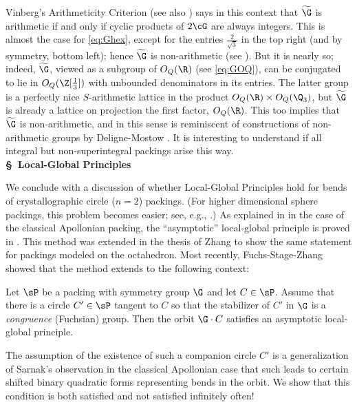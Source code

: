 \documentclass[12pt,reqno]{amsart}
\begin{document}
Vinberg's Arithmeticity Criterion \cite{Vinberg1967} (see also \cite[Theorem 3.1]{VinbergShvartsman1993}) says in this context that $\widetilde\G$ is arithmetic if and only if cyclic products of $2\cG$ are always integers. 
This is almost the case for \eqref{eq:Ghex}, except for the entries $\frac2{\sqrt3}$ in the top right (and by symmetry, bottom left); hence $\widetilde\G$ is non-arithmetic (see ). But it is nearly so; indeed, $\widetilde\G$, viewed as a subgroup of $O_Q(\R)$ (see \eqref{eq:GOQ}), can be conjugated to lie in $O_Q(\Z[\frac13])$ with unbounded denominators in its entries. The latter group is a perfectly nice $S$-arithmetic lattice in the product $O_Q(\R)\times O_Q(\Q_3)$, but $\widetilde\G$ is already a lattice on projection the first factor, $O_Q(\R)$. This too implies that $\widetilde\G$ is non-arithmetic, and in this sense is reminiscent of constructions of non-arithmetic groups by Deligne-Mostow \cite{DeligneMostow1986}. It is interesting to understand if all integral but non-superintegral packings arise this way. 
\\

\noindent
{\bf\S\  Local-Global Principles}\

We conclude with a discussion of whether  Local-Global Principles hold for bends of crystallographic circle ($n=2$) packings. (For higher dimensional sphere packings, this problem becomes easier; see, e.g., \cite{Kontorovich2017}.) As explained in \cite{Kontorovich2013} in the case of the classical Apollonian packing, the ``asymptotic'' local-global principle is proved in \cite{BourgainKontorovich2014b}.
This method was extended in the thesis of Zhang \cite{Zhang2015} to show the same statement for packings modeled on the octahedron. Most recently,
 Fuchs-Stage-Zhang showed that the method extends to the following context:
\begin{thm}\label{thm:FSZ}
 Let $\sP$ be a packing with symmetry group $\G$ and let $C\in\sP$. Assume that  there is a circle $C'\in\sP$ tangent to $C$ so that the stabilizer of $C'$ in $\G$ is a \emph{congruence} (Fuchsian) group. Then the orbit $\G\cdot C$ satisfies an asymptotic local-global principle.
\end{thm} 

The assumption of the existence of such a companion circle $C'$ is a generalization of Sarnak's observation \cite{SarnakToLagarias} in the classical Apollonian case that such leads to certain shifted binary quadratic forms representing bends in the orbit. We show that this condition is both satisfied and not satisfied infinitely often!
\end{document}
